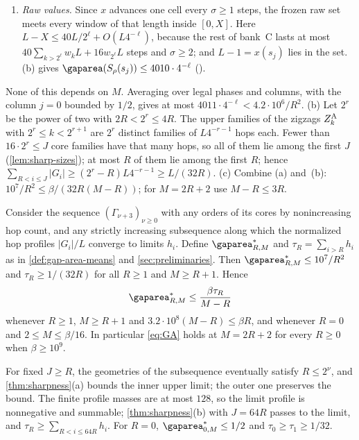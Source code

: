 \begin{outline}
\begin{enumerate}[label=(\roman*)]
\item \emph{Raw values.} Since $x$ advances one cell every $\sigma\ge1$ steps, the frozen
raw set meets every window of that length inside $[0,X]$. Here
$L-X\le40L/2^\ell+O(L4^{-\ell})$, because the rest of bank~C lasts at most
$40\sum_{k>2^\ell}w_kL+16w_{2^\ell}L$ steps and $\sigma\ge2$; and $L-1=x(s_j)$ lies in the
set. (b) gives $\gaparea(S_\rho(s_j))\le4010\cdot4^{-\ell}$
().
\end{enumerate}
None of this depends on $M$. Averaging over legal phases and columns, with the column
$j=0$ bounded by $1/2$, gives at most $4011\cdot4^{-\ell}<4.2\cdot10^6/R^2$. (b) Let
$2^r$ be the power of two with $2R<2^r\le4R$. The upper families of the zigzags $Z^{\mathrm A}_k$
with $2^r\le k<2^{r+1}$ are $2^r$ distinct families of $L4^{-r-1}$ hops each. Fewer than
$16\cdot2^r\le J$ core families have that many hops, so all of them lie among the first $J$
(\cref{lem:sharp-sizes}); at most $R$ of them lie among the first $R$; hence
$\sum_{R<i\le J}|G_i|\ge(2^r-R)L4^{-r-1}\ge L/(32R)$. (c) Combine (a) and~(b):
$10^7/R^2\le\beta/(32R(M-R))$; for $M=2R+2$ use $M-R\le3R$.
\end{outline}

\begin{corollary}\label{cor:sharpness-limit}
Consider the sequence $(\Gamma_{\nu+3})_{\nu\ge0}$ with any orders of its cores by
nonincreasing hop count, and any strictly increasing subsequence along which the
normalized hop profiles $|G_i|/L$ converge to limits $h_i$. Define $\limarea_{R,M}$ and
$\tau_R=\sum_{i>R}h_i$ as in \cref{def:gap-area-means} and \cref{sec:preliminaries}.
Then $\limarea_{R,M}\le10^7/R^2$ and $\tau_R\ge1/(32R)$ for all $R\ge1$ and $M\ge R+1$.
Hence
\[
 \limarea_{R,M}\le\frac{\beta\tau_R}{M-R}
\]
whenever $R\ge1$, $M\ge R+1$ and $3.2\cdot10^8(M-R)\le\beta R$, and whenever $R=0$ and
$2\le M\le\beta/16$. In particular \eqref{eq:GA} holds at $M=2R+2$ for every $R\ge0$
when $\beta\ge10^9$.
\end{corollary}

\begin{outline}
For fixed $J\ge R$, the geometries of the subsequence eventually satisfy $R\le2^\nu$, and
\cref{thm:sharpness}(a) bounds the inner upper limit; the outer one preserves the bound.
The finite profile masses are at most $128$, so the limit profile is nonnegative and
summable; \cref{thm:sharpness}(b) with $J=64R$ passes to the limit, and
$\tau_R\ge\sum_{R<i\le64R}h_i$. For $R=0$, $\limarea_{0,M}\le1/2$ and
$\tau_0\ge\tau_1\ge1/32$.
\end{outline}

